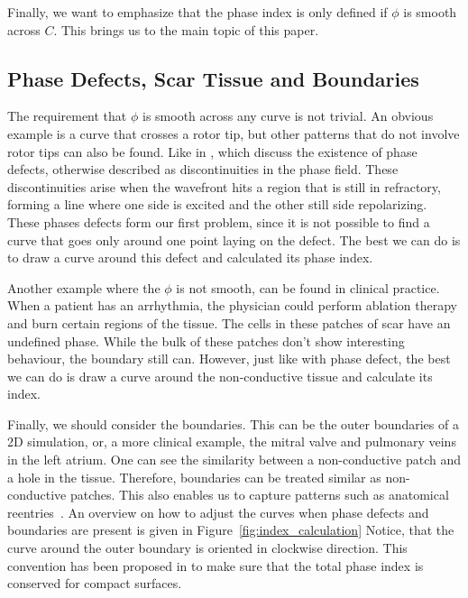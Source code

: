 \documentclass[twocolumn]{article}
\begin{document}
Finally, we want to emphasize that the phase index is only defined if $\phi$ is smooth across $C$.
This brings us to the main topic of this paper.

\subsection{Phase Defects, Scar Tissue and Boundaries}

The requirement that $\phi$ is smooth across any curve is not trivial.
An obvious example is a curve that crosses a rotor tip,
but other patterns that do not involve rotor tips can also be found.
Like in \textcite{arno2021a, tomii2021spatial},
which discuss the existence of phase defects,
otherwise described as discontinuities in the phase field.
These discontinuities arise when the wavefront hits a region that is still in refractory,
forming a line where one side is excited and the other still side repolarizing.
These phases defects form our first problem,
since it is not possible to find a curve
that goes only around one point laying on the defect.
The best we can do is to draw a curve around this defect and calculated its phase index.

Another example where the $\phi$ is not smooth,
can be found in clinical practice.
When a patient has an arrhythmia,
the physician could perform ablation therapy
and burn  certain regions of the tissue.
The cells in these patches of scar have an undefined phase.
While the bulk of these patches don't show interesting behaviour,
the boundary still can.
However, just like with phase defect,
the best we can do is draw a curve around the non-conductive tissue
and calculate its index.

Finally, we should consider the boundaries.
This can be the outer boundaries of a 2D simulation,
or, a more clinical example, the mitral valve and pulmonary veins in the left atrium.
One can see the similarity between a non-conductive patch
and a hole in the tissue.
Therefore, boundaries can be treated similar as non-conductive patches.
This also enables us to capture patterns such as anatomical reentries~\autocite{duytschaever2024atrial}.
An overview on how to adjust the curves when phase defects and boundaries are present
is given in Figure~\ref{fig:index_calculation}
Notice, that the curve around the outer boundary is oriented in clockwise direction.
This convention has been proposed in \textcite{davidsen2004topological} to make sure
that the total phase index is conserved for compact surfaces.
\end{document}
